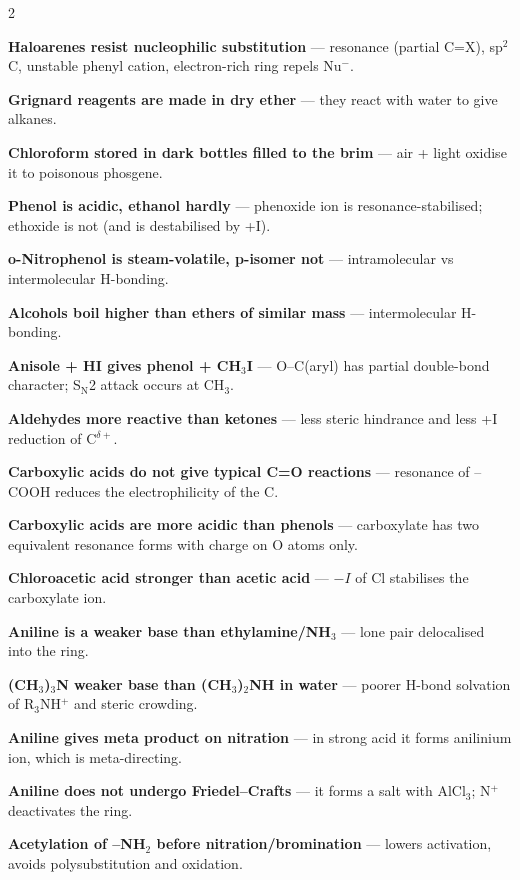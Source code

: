 \documentclass[9pt,a4paper]{extarticle}
\begin{document}
\begin{multicols}{2}
{\scriptsize
\begin{fl}
\item \textbf{Haloarenes resist nucleophilic substitution} — resonance (partial C=X), sp$^2$ C, unstable phenyl cation, electron-rich ring repels Nu$^-$.
\item \textbf{Grignard reagents are made in dry ether} — they react with water to give alkanes.
\item \textbf{Chloroform stored in dark bottles filled to the brim} — air + light oxidise it to poisonous phosgene.
\item \textbf{Phenol is acidic, ethanol hardly} — phenoxide ion is resonance-stabilised; ethoxide is not (and is destabilised by +I).
\item \textbf{o-Nitrophenol is steam-volatile, p-isomer not} — intramolecular vs intermolecular H-bonding.
\item \textbf{Alcohols boil higher than ethers of similar mass} — intermolecular H-bonding.
\item \textbf{Anisole + HI gives phenol + CH$_3$I} — O--C(aryl) has partial double-bond character; S$_\text{N}$2 attack occurs at CH$_3$.
\item \textbf{Aldehydes more reactive than ketones} — less steric hindrance and less +I reduction of C$^{\delta+}$.
\item \textbf{Carboxylic acids do not give typical C=O reactions} — resonance of --COOH reduces the electrophilicity of the C.
\item \textbf{Carboxylic acids are more acidic than phenols} — carboxylate has two equivalent resonance forms with charge on O atoms only.
\item \textbf{Chloroacetic acid stronger than acetic acid} — $-I$ of Cl stabilises the carboxylate ion.
\item \textbf{Aniline is a weaker base than ethylamine/NH$_3$} — lone pair delocalised into the ring.
\item \textbf{(CH$_3$)$_3$N weaker base than (CH$_3$)$_2$NH in water} — poorer H-bond solvation of R$_3$NH$^+$ and steric crowding.
\item \textbf{Aniline gives meta product on nitration} — in strong acid it forms anilinium ion, which is meta-directing.
\item \textbf{Aniline does not undergo Friedel--Crafts} — it forms a salt with AlCl$_3$; N$^+$ deactivates the ring.
\item \textbf{Acetylation of --NH$_2$ before nitration/bromination} — lowers activation, avoids polysubstitution and oxidation.

\end{fl}}
\end{multicols}
\end{document}
